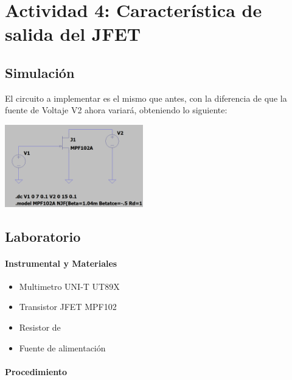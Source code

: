 \newpage

\section{Actividad 4: Característica de salida del JFET}

\subsection{Simulación}

El circuito a implementar es el mismo que antes, con la diferencia de que la fuente de Voltaje V2 ahora variará, obteniendo lo siguiente:

\includegraphics[width=6cm]{./imagenes/Circ4.png}

\subsection{Laboratorio}

\paragraph{Instrumental y Materiales}
\begin{itemize}
    \item Multimetro UNI-T UT89X
    \item Transistor JFET MPF102
    \item Resistor de
    \item Fuente de alimentación
\end{itemize}

\paragraph{Procedimiento}